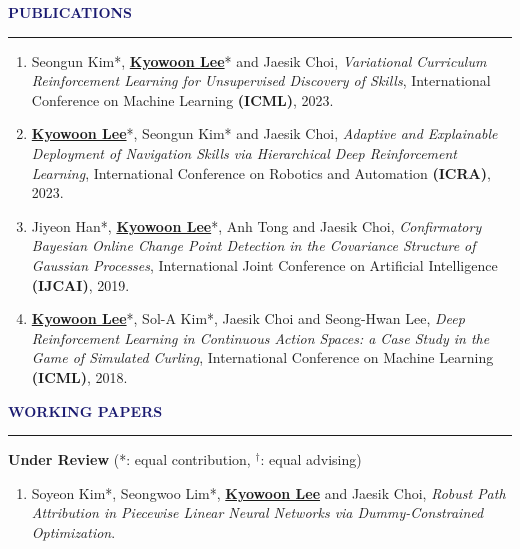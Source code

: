 \documentclass{resume} %
\renewenvironment{rSection}[1]{
\sectionskip
\textcolor{MidnightBlue}{\MakeUppercase{#1}}
\sectionlineskip
\hrule
\begin{list}{}{
\setlength{\leftmargin}{1.5em}
}
\item[]
}{
\end{list}
}
\begin{document}
\begin{rSection}{\bf Publications}
\begin{enumerate}
    \item Seongun Kim*, \underline{\textbf{Kyowoon Lee}}* and Jaesik Choi, \emph{Variational Curriculum Reinforcement Learning for Unsupervised Discovery of Skills}, International Conference on Machine Learning \textbf{(ICML)}, 2023.
    \item \underline{\textbf{Kyowoon Lee}}*, Seongun Kim* and Jaesik Choi, \emph{Adaptive and Explainable Deployment of Navigation Skills via Hierarchical Deep Reinforcement Learning}, International Conference on Robotics and Automation \textbf{(ICRA)}, 2023.
    \item Jiyeon Han*, \underline{\textbf{Kyowoon Lee}}*, Anh Tong and Jaesik Choi, \emph{Confirmatory Bayesian Online Change Point Detection in the Covariance Structure of Gaussian Processes}, International Joint Conference on Artificial Intelligence \textbf{(IJCAI)}, 2019.
    \item \underline{\textbf{Kyowoon Lee}}*, Sol-A Kim*, Jaesik Choi and Seong-Hwan Lee, \emph{Deep Reinforcement Learning in Continuous Action Spaces: a Case Study in the Game of Simulated Curling}, International Conference on Machine Learning \textbf{(ICML)}, 2018.
\end{enumerate}
\end{rSection}

\begin{rSection}{\bf Working Papers}
{\textbf{Under Review}} (*: equal contribution, $^\dagger$: equal advising)
\begin{enumerate}
    \item Soyeon Kim*, Seongwoo Lim*, \underline{\textbf{Kyowoon Lee}} and Jaesik Choi, \emph{Robust Path Attribution in Piecewise Linear Neural Networks via Dummy-Constrained Optimization}.
\end{enumerate}
\end{rSection}
\end{document}
